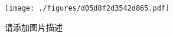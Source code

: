 
\begin{figure}[ht]
\centering
\texttt{[image: ./figures/d05d8f2d3542d865.pdf]}
\caption{请添加图片描述} \label{fig_testxr_1}
\end{figure}